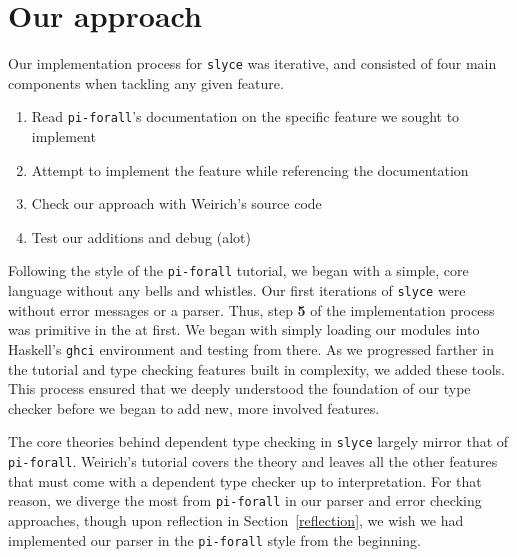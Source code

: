 \section{Our approach}
Our implementation process for \texttt{slyce} was iterative, and consisted of four main components when tackling any given feature.
\begin{enumerate}
    \item Read \texttt{pi-forall}'s documentation on the specific feature we sought to implement
    \item Attempt to implement the feature while referencing the documentation
    \item Check our approach with Weirich's source code
    \item Test our additions and debug (alot)
\end{enumerate}

Following the style of the \texttt{pi-forall} tutorial, we began with a simple, core language without any bells and whistles.
Our first iterations of \texttt{slyce} were without error messages or a parser.
Thus, step \textbf{5} of the implementation process was primitive in the at first. 
We began with simply loading our modules into Haskell's \texttt{ghci} environment and testing from there.
As we progressed farther in the tutorial and type checking features built in complexity, we added these tools.
This process ensured that we deeply understood the foundation of our type checker before we began to add new, more involved features. 

The core theories behind dependent type checking in \texttt{slyce} largely mirror that of \texttt{pi-forall}.
Weirich's tutorial covers the theory and leaves all the other features that must come with a dependent type checker up to interpretation.
For that reason, we diverge the most from \texttt{pi-forall} in our parser and error checking approaches, though upon reflection in Section~\ref{reflection}, we wish we had implemented our parser in the \texttt{pi-forall} style from the beginning.